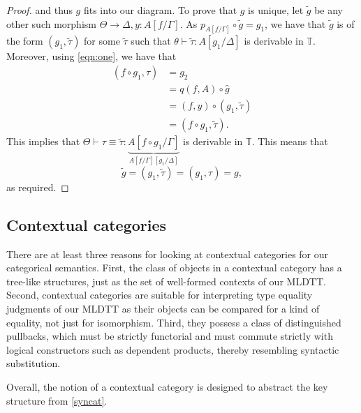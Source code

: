 \documentclass[10pt,letterpaper,cm]{nupset}
\theoremstyle{definition}
\theoremstyle{theorem}
\theoremstyle{remark}
\newcommand{\0}{\mathbf{0}}
\newcommand{\1}{\mathbf{1}}
\newcommand{\2}{\mathbf{2}}
\newcommand{\T}{\mathbb T}
\begin{document}
\begin{proof}
and thus $g$ fits into our diagram. To prove that $g$ is unique, let $\tilde{g}$ be any other such morphism $\Theta \to {\Delta, y : A\left[f/\Gamma\right]}$. As $p_{A\left[f/\Gamma\right]} \circ \tilde{g} = g_1$, we have that $\tilde{g}$ is of the form $\left(g_1, \tilde{\tau}\right)$ for some  $\tilde{\tau}$ such that $\theta \vdash \tilde{\tau} : A[g_1/\Delta]$ is derivable in $\T$. Moreover, using \eqref{eqn:one}, we have that
\begin{align*}
 \left(f \circ g_1, \tau\right) & = g_2 
\\ & = q(f,A) \circ \hat{g} 
\\ & = \left(f, y\right) \circ \left(g_1, \tilde{\tau}\right)
\\ & = \left(f \circ g_1, \tilde{\tau}\right).
\end{align*}
This implies that $\Theta \vdash \tau \equiv \tilde{\tau} : \underbrace{A[f\circ g_1/\Gamma]}_{A\left[f/\Gamma\right]\left[g_1/\Delta\right]}$ is derivable in $\T$. This means that $$\tilde{g} = \left(g_1, \tilde{\tau}\right) = \left(g_1, \tau\right) = g,$$ as required. 
\end{proof}


\subsection{Contextual categories}\label{CC}

There are at least three reasons for looking at contextual categories for our categorical semantics. First, the class of objects in a contextual category has a tree-like structures, just as the set of well-formed contexts of our MLDTT. Second, contextual categories are suitable for interpreting type equality judgments of our MLDTT as their objects can be compared for a kind of equality, not just for isomorphism. Third, they possess a  class of distinguished pullbacks, which must be strictly functorial and must commute strictly with logical constructors such as dependent products, thereby resembling syntactic substitution.

\medskip 

Overall, the notion of a contextual category is designed to abstract the key structure from \cref{syncat}.
\end{document}
